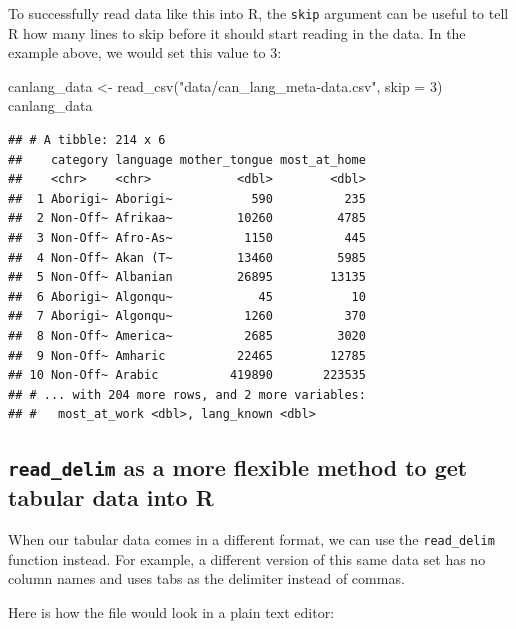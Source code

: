 \documentclass[
]{krantz}
\makeatletter
\newenvironment{Shaded}{\begin{snugshade}}{\end{snugshade}}
\newcommand{\AttributeTok}[1]{\textcolor[rgb]{0.61,0.61,0.61}{#1}}
\newcommand{\DecValTok}[1]{\textcolor[rgb]{0.06,0.06,0.06}{#1}}
\newcommand{\FunctionTok}[1]{\textcolor[rgb]{0,0,0}{#1}}
\newcommand{\NormalTok}[1]{#1}
\newcommand{\OtherTok}[1]{\textcolor[rgb]{0.37,0.37,0.37}{#1}}
\newcommand{\StringTok}[1]{\textcolor[rgb]{0.5,0.5,0.5}{#1}}
\newenvironment{kframe}{%
\medskip{}
\setlength{\fboxsep}{.8em}
 \def\at@end@of@kframe{}%
 \ifinner\ifhmode%
  \def\at@end@of@kframe{\end{minipage}}%
  \begin{minipage}{\columnwidth}%
 \fi\fi%
 \def\FrameCommand##1{\hskip\@totalleftmargin \hskip-\fboxsep
 \colorbox{shadecolor}{##1}\hskip-\fboxsep
     \hskip-\linewidth \hskip-\@totalleftmargin \hskip\columnwidth}%
 \MakeFramed {\advance\hsize-\width
   \@totalleftmargin\z@ \linewidth\hsize
   \@setminipage}}%
 {\par\unskip\endMakeFramed%
 \at@end@of@kframe}
\renewenvironment{Shaded}{\begin{kframe}}{\end{kframe}}
\makeatother
\begin{document}
To successfully read data like this into R, the \texttt{skip} argument can be useful to tell R how many lines to skip before it should start reading in the data. In the example above, we would set this value to 3:

\begin{Shaded}
\begin{Highlighting}[]
\NormalTok{canlang\_data }\OtherTok{\textless{}{-}} \FunctionTok{read\_csv}\NormalTok{(}\StringTok{"data/can\_lang\_meta{-}data.csv"}\NormalTok{, }\AttributeTok{skip =} \DecValTok{3}\NormalTok{)}
\NormalTok{canlang\_data}
\end{Highlighting}
\end{Shaded}

\begin{verbatim}
## # A tibble: 214 x 6
##    category language mother_tongue most_at_home
##    <chr>    <chr>            <dbl>        <dbl>
##  1 Aborigi~ Aborigi~           590          235
##  2 Non-Off~ Afrikaa~         10260         4785
##  3 Non-Off~ Afro-As~          1150          445
##  4 Non-Off~ Akan (T~         13460         5985
##  5 Non-Off~ Albanian         26895        13135
##  6 Aborigi~ Algonqu~            45           10
##  7 Aborigi~ Algonqu~          1260          370
##  8 Non-Off~ America~          2685         3020
##  9 Non-Off~ Amharic          22465        12785
## 10 Non-Off~ Arabic          419890       223535
## # ... with 204 more rows, and 2 more variables:
## #   most_at_work <dbl>, lang_known <dbl>
\end{verbatim}

\hypertarget{read_delim-as-a-more-flexible-method-to-get-tabular-data-into-r}{%
\subsection{\texorpdfstring{\texttt{read\_delim} as a more flexible method to get tabular data into R}{read\_delim as a more flexible method to get tabular data into R}}\label{read_delim-as-a-more-flexible-method-to-get-tabular-data-into-r}}

When our tabular data comes in a different format, we can use the \texttt{read\_delim} function instead. For example, a different version of this same data set has no column names and uses tabs as the delimiter instead of commas.

Here is how the file would look in a plain text editor:
\end{document}
